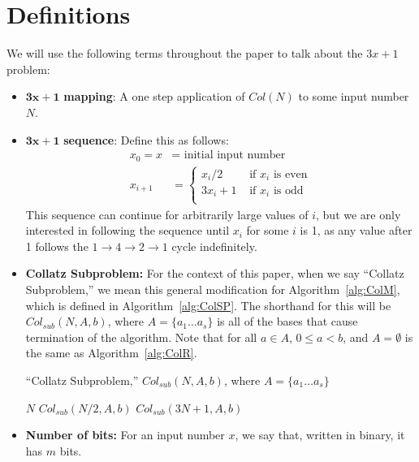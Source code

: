 \documentclass[12pt]{article}
\newcommand{\Mod}[1]{\ (\mathrm{mod}\ #1)}
\theoremstyle{definition}
\begin{document}
\section{Definitions} \label{sec:defns}
We will use the following terms throughout the paper to talk about the $3x+1$ problem:
\begin{itemize}
    \item $\boldsymbol{3x+1}$\textbf{ mapping}: A one step application of $Col(N)$ to some input number $N$.
    \item $\boldsymbol{3x+1}$\textbf{ sequence}: Define this as follows: 
    \begin{align*}
        x_0 = x &= \text{ initial input number} \\
        x_{i+1} &= \begin{cases} 
        x_{i}/2 &\text{ if $x_i$ is even} \\
        3 x_{i} + 1 &\text{ if $x_i$ is odd} \\
        \end{cases}
    \end{align*}
    This sequence can continue for arbitrarily large values of $i$, but we are only interested in following the sequence until $x_i$ for some $i$ is 1, as any value after 1 follows the $1 \rightarrow 4 \rightarrow 2 \rightarrow 1$ cycle indefinitely.
    \item \textbf{Collatz Subproblem:} For the context of this paper, when we say ``Collatz Subproblem,'' we mean this general modification for Algorithm~\ref{alg:ColM}, which is defined in Algorithm~\ref{alg:ColSP}. The shorthand for this will be $Col_{sub}(N,A,b)$, where $A = \{a_1 \ldots a_s\}$ is all of the bases that cause termination of the algorithm. Note that for all $a \in A$, $0 \le a < b$, and $A = \emptyset$ is the same as Algorithm~\ref{alg:ColR}.
    \begin{algorithm} 
    \caption{``Collatz Subproblem,'' $Col_{sub}(N,A,b)$, where $A = \{a_1 \ldots a_s\}$}
    \label{alg:ColSP} 
    \begin{algorithmic}[1]
        \If{$(N \leq 1) \vee (N \equiv a_1  \Mod{b}) \vee \ldots \vee (N \equiv a_s \Mod{b})$ } \Return $N$
        \EndIf
        \If {$N \equiv 0 \Mod{2}$} \Return $Col_{sub}(N/2,A,b)$
        \EndIf
        \State \Return $Col_{sub}(3N + 1,A,b)$ 
    \end{algorithmic}
    \end{algorithm}
    \item \textbf{Number of bits:} For an input number $x$, we say that, written in binary, it has $m$ bits.

\end{itemize}
\end{document}
